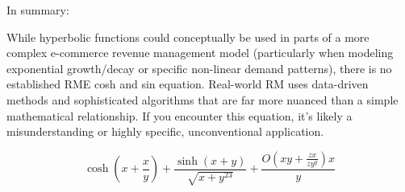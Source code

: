 \documentclass{book}
\begin{document}
In summary:

While hyperbolic functions could conceptually be used in parts of a more complex e-commerce revenue management model (particularly when modeling exponential growth/decay or specific non-linear demand patterns), there is no established RME cosh and sin equation. Real-world RM uses data-driven methods and sophisticated algorithms that are far more nuanced than a simple mathematical relationship. If you encounter this equation, it's likely a misunderstanding or highly specific, unconventional application.

\begin{equation}
\cosh \left( x + \frac{x}{y} \right)  + \frac{\sinh \left( x + y\right) }{\sqrt{x + y ^{23}}}  + \frac{O\left( xy + \frac{zx}{zy ^{y}} \right)  x}{y} 
\end{equation}
\end{document}
